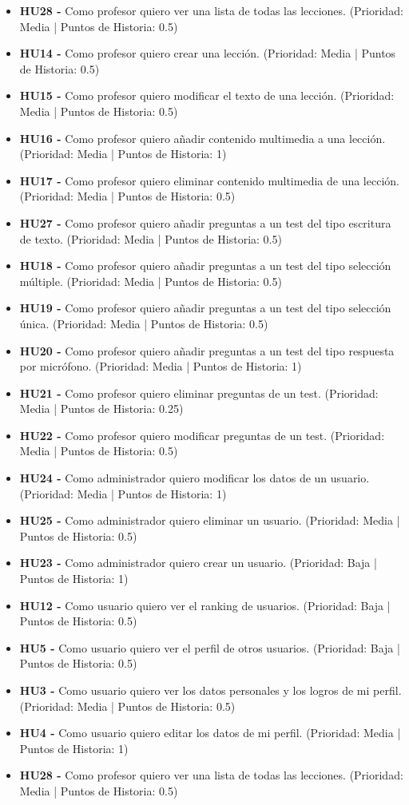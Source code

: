 \begin{itemize}
    \item \textbf{HU28 - } Como profesor quiero ver una lista de todas las lecciones. (Prioridad: Media | Puntos de Historia: 0.5)
    \item \textbf{HU14 - } Como profesor quiero crear una lección. (Prioridad: Media | Puntos de Historia: 0.5)
    \item \textbf{HU15 - } Como profesor quiero modificar el texto de una lección. (Prioridad: Media | Puntos de Historia: 0.5)
    \item \textbf{HU16 - } Como profesor quiero añadir contenido multimedia a una lección. (Prioridad: Media | Puntos de Historia: 1)
    \item \textbf{HU17 - } Como profesor quiero eliminar contenido multimedia de una lección. (Prioridad: Media | Puntos de Historia: 0.5)
    \item \textbf{HU27 - } Como profesor quiero añadir preguntas a un test del tipo escritura de texto. (Prioridad: Media | Puntos de Historia: 0.5)
    \item \textbf{HU18 - } Como profesor quiero añadir preguntas a un test del tipo selección múltiple. (Prioridad: Media | Puntos de Historia: 0.5)
    \item \textbf{HU19 - } Como profesor quiero añadir preguntas a un test del tipo selección única. (Prioridad: Media | Puntos de Historia: 0.5)
    \item \textbf{HU20 - } Como profesor quiero añadir preguntas a un test del tipo respuesta por micrófono. (Prioridad: Media | Puntos de Historia: 1)
    \item \textbf{HU21 - } Como profesor quiero eliminar preguntas de un test. (Prioridad: Media | Puntos de Historia: 0.25)
    \item \textbf{HU22 - } Como profesor quiero modificar preguntas de un test. (Prioridad: Media | Puntos de Historia: 0.5)
    \item \textbf{HU24 - } Como administrador quiero modificar los datos de un usuario. (Prioridad: Media | Puntos de Historia: 1)
    \item \textbf{HU25 - } Como administrador quiero eliminar un usuario. (Prioridad: Media | Puntos de Historia: 0.5)
    \item \textbf{HU23 - } Como administrador quiero crear un usuario. (Prioridad: Baja | Puntos de Historia: 1)
    \item \textbf{HU12 - } Como usuario quiero ver el ranking de usuarios. (Prioridad: Baja | Puntos de Historia: 0.5)
    \item \textbf{HU5 - } Como usuario quiero ver el perfil de otros usuarios.  (Prioridad: Baja | Puntos de Historia: 0.5)
    \item \textbf{HU3 - } Como usuario quiero ver los datos personales y los logros de mi perfil. (Prioridad: Media | Puntos de Historia: 0.5)
    \item \textbf{HU4 - } Como usuario quiero editar los datos de mi perfil. (Prioridad: Media | Puntos de Historia: 1)
    \item \textbf{HU28 - } Como profesor quiero ver una lista de todas las lecciones. (Prioridad: Media | Puntos de Historia: 0.5)



\end{itemize}

